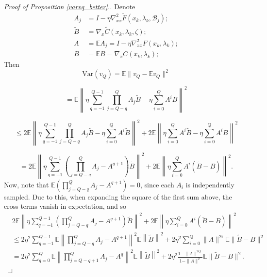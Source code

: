 \documentclass[11pt, twoside]{report}
\begin{document}
\begin{proof}[Proof of Proposition \ref{varvq_better}.]
Denote
\begin{align*}
    A_j &= I- \eta \nabla_{xx}^2 \tilde{F}(x_k,\lambda_k, \mathcal{B}_j); \\
    \tilde{B} &= \nabla_x \tilde{C} (x_k,\lambda_k,\zeta); \\
    A &= \mathbb{E}A_j = I- \eta \nabla_{xx}^2 F(x_k,\lambda_k); \\
    B &= \mathbb{E}B = \nabla_x C (x_k,\lambda_k);
\end{align*}
Then 
\[\mathrm{Var}(v_Q) = \mathbb{E} \|v_Q - \mathbb{E}v_Q \|^2\]

\[= \mathbb{E} \left\|\eta \sum_{q=-1}^{Q-1} \prod_{j = Q-q}^Q A_j \tilde{B} - \eta \sum_{i=0}^Q A^i B \right\|^2\]

\[\leq 2 \mathbb{E} \left\| \eta \sum_{q=-1}^{Q-1} \prod_{j = Q-q}^Q A_j \tilde{B} - \eta \sum_{i=0}^Q A^i \tilde{B} \right\|^2 + 2\mathbb{E} \left\| \eta \sum_{i=0}^Q A^i \tilde{B} - \eta \sum_{i=0}^Q A^i B \right\|^2 \]

\[= 2 \mathbb{E} \left\| \eta \sum_{q=-1}^{Q-1} \left( \prod_{j = Q-q}^Q A_j - A^{q+1} \right) \tilde{B} \right\|^2 + 2\mathbb{E} \left\| \eta \sum_{i=0}^Q A^i (\tilde{B} - B) \right\|^2. \]
Now, note that $\mathbb{E}\left( \prod_{j = Q-q}^Q A_j - A^{q+1} \right) = 0$, since each $A_i$ is independently sampled. Due to this, when expanding the square of the first sum above, the cross terms vanish in expectation, and so
{\setlength{\abovedisplayskip}{6pt}
 \setlength{\belowdisplayskip}{6pt}
\begin{align*}
& 2 \mathbb{E} \left\| \eta \sum_{q=-1}^{Q-1} 
   \left( \prod_{j = Q-q}^Q A_j - A^{q+1} \right) \tilde{B} \right\|^2 + 2\mathbb{E} \left\| \eta \sum_{i=0}^Q A^i (\tilde{B} - B) \right\|^2 \\
&\leq 2 \eta^2 \sum_{q=-1}^{Q-1} 
   \mathbb{E} \left\| \prod_{j = Q-q}^Q A_j - A^{q+1} \right\|^2 
   \mathbb{E} \left\| \tilde{B} \right\|^2 + 2\eta^2 \sum_{i=0}^Q \|  A \|^{2i} \mathbb{E} \|\tilde{B} - B\|^2 \\
&= 2 \eta^2 \sum_{q=0}^{Q} 
   \mathbb{E} \left\| \prod_{j = Q-q+1}^Q A_j - A^{q} \right\|^2 
   \mathbb{E} \left\| \tilde{B} \right\|^2 + 2\eta^2 \frac{1-\|A\|^{2Q}}{1-\|A\|^2} 
   \mathbb{E} \|\tilde{B} - B\|^2.
\end{align*}}


\end{proof}
\end{document}
